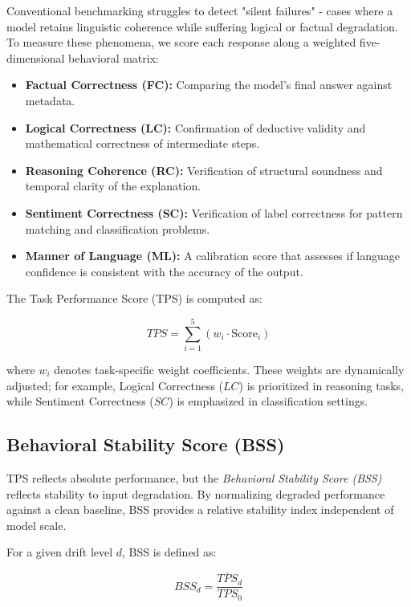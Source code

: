\documentclass[conference]{IEEEtran}
\begin{document}
Conventional benchmarking struggles to detect "silent failures" - cases where a model retains linguistic coherence while suffering logical or factual degradation. To measure these phenomena, we score each response along a weighted five-dimensional behavioral matrix:

\begin{itemize}
\item \textbf{Factual Correctness (FC):} Comparing the model's final answer against metadata.
\item \textbf{Logical Correctness (LC):} Confirmation of deductive validity and mathematical correctness of intermediate steps.
\item \textbf{Reasoning Coherence (RC):} Verification of structural soundness and temporal clarity of the explanation.
\item \textbf{Sentiment Correctness (SC):} Verification of label correctness for pattern matching and classification problems.
\item \textbf{Manner of Language (ML):} A calibration score that assesses if language confidence is consistent with the accuracy of the output.
\end{itemize}

The Task Performance Score (TPS) is computed as:

\begin{equation}
TPS = \sum_{i=1}^{5} \left( w_i \cdot \text{Score}_i \right)
\end{equation}

where $w_i$ denotes task-specific weight coefficients. These weights are dynamically adjusted; for example, Logical Correctness ($LC$) is prioritized in reasoning tasks, while Sentiment Correctness ($SC$) is emphasized in classification settings.

\subsection{Behavioral Stability Score (BSS)}

TPS reflects absolute performance, but the \textit{Behavioral Stability Score (BSS)} reflects stability to input degradation. By normalizing degraded performance against a clean baseline, BSS provides a relative stability index independent of model scale.

For a given drift level $d$, BSS is defined as:

\begin{equation}
BSS_d = \frac{\overline{TPS}_d}{TPS_0}
\end{equation}
\end{document}
